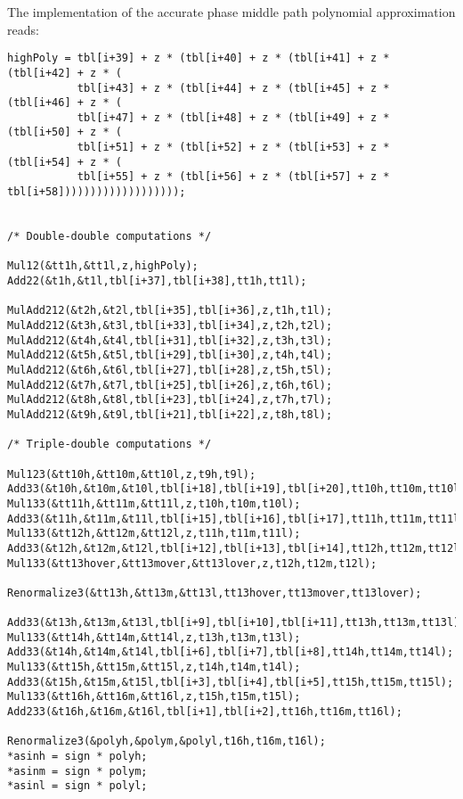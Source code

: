 The implementation of the accurate phase middle path polynomial approximation reads:
\begin{lstlisting}[caption={Middle path accurate phase polynomial approximation},firstnumber=1]
highPoly = tbl[i+39] + z * (tbl[i+40] + z * (tbl[i+41] + z * (tbl[i+42] + z * (
           tbl[i+43] + z * (tbl[i+44] + z * (tbl[i+45] + z * (tbl[i+46] + z * (
           tbl[i+47] + z * (tbl[i+48] + z * (tbl[i+49] + z * (tbl[i+50] + z * (
           tbl[i+51] + z * (tbl[i+52] + z * (tbl[i+53] + z * (tbl[i+54] + z * (
           tbl[i+55] + z * (tbl[i+56] + z * (tbl[i+57] + z * tbl[i+58]))))))))))))))))));


/* Double-double computations */

Mul12(&tt1h,&tt1l,z,highPoly);
Add22(&t1h,&t1l,tbl[i+37],tbl[i+38],tt1h,tt1l);

MulAdd212(&t2h,&t2l,tbl[i+35],tbl[i+36],z,t1h,t1l);
MulAdd212(&t3h,&t3l,tbl[i+33],tbl[i+34],z,t2h,t2l);
MulAdd212(&t4h,&t4l,tbl[i+31],tbl[i+32],z,t3h,t3l);
MulAdd212(&t5h,&t5l,tbl[i+29],tbl[i+30],z,t4h,t4l);
MulAdd212(&t6h,&t6l,tbl[i+27],tbl[i+28],z,t5h,t5l);
MulAdd212(&t7h,&t7l,tbl[i+25],tbl[i+26],z,t6h,t6l);
MulAdd212(&t8h,&t8l,tbl[i+23],tbl[i+24],z,t7h,t7l);
MulAdd212(&t9h,&t9l,tbl[i+21],tbl[i+22],z,t8h,t8l);

/* Triple-double computations */

Mul123(&tt10h,&tt10m,&tt10l,z,t9h,t9l);
Add33(&t10h,&t10m,&t10l,tbl[i+18],tbl[i+19],tbl[i+20],tt10h,tt10m,tt10l);
Mul133(&tt11h,&tt11m,&tt11l,z,t10h,t10m,t10l);
Add33(&t11h,&t11m,&t11l,tbl[i+15],tbl[i+16],tbl[i+17],tt11h,tt11m,tt11l);
Mul133(&tt12h,&tt12m,&tt12l,z,t11h,t11m,t11l);
Add33(&t12h,&t12m,&t12l,tbl[i+12],tbl[i+13],tbl[i+14],tt12h,tt12m,tt12l);
Mul133(&tt13hover,&tt13mover,&tt13lover,z,t12h,t12m,t12l);

Renormalize3(&tt13h,&tt13m,&tt13l,tt13hover,tt13mover,tt13lover);

Add33(&t13h,&t13m,&t13l,tbl[i+9],tbl[i+10],tbl[i+11],tt13h,tt13m,tt13l);
Mul133(&tt14h,&tt14m,&tt14l,z,t13h,t13m,t13l);
Add33(&t14h,&t14m,&t14l,tbl[i+6],tbl[i+7],tbl[i+8],tt14h,tt14m,tt14l);
Mul133(&tt15h,&tt15m,&tt15l,z,t14h,t14m,t14l);
Add33(&t15h,&t15m,&t15l,tbl[i+3],tbl[i+4],tbl[i+5],tt15h,tt15m,tt15l);
Mul133(&tt16h,&tt16m,&tt16l,z,t15h,t15m,t15l);
Add233(&t16h,&t16m,&t16l,tbl[i+1],tbl[i+2],tt16h,tt16m,tt16l);

Renormalize3(&polyh,&polym,&polyl,t16h,t16m,t16l);
*asinh = sign * polyh;
*asinm = sign * polym;
*asinl = sign * polyl;
\end{lstlisting}

